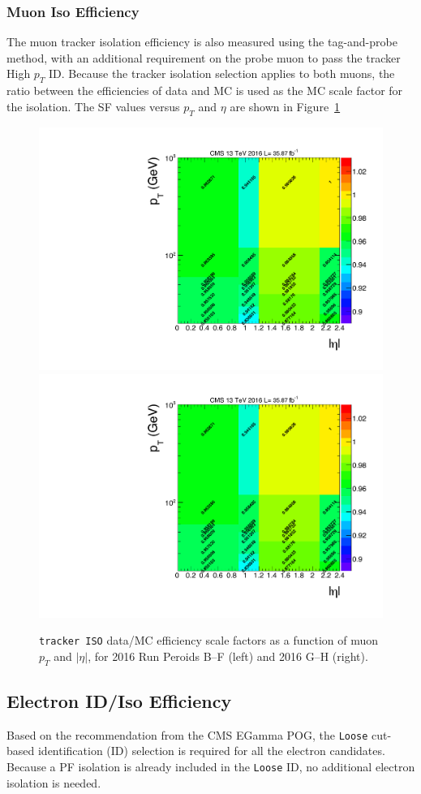 \subsubsection{Muon Iso Efficiency}
The muon tracker isolation efficiency is also measured using the tag-and-probe method, with an additional requirement on the probe muon to pass the tracker High $p_T$ ID. Because the tracker isolation selection applies to both muons, the ratio between the efficiencies of data and MC is used as the MC scale factor for the isolation. The SF values versus $p_T$ and $\eta$ are shown in Figure~\ref{fig:bg_muonisosf}
\begin{figure}[htbp]
\begin{center}
\includegraphics[width=0.49\linewidth, page=7]{figures/bg_muonidisoeff.pdf}
\includegraphics[width=0.49\linewidth, page=8]{figures/bg_muonidisoeff.pdf}
\caption{\texttt{tracker ISO} data/MC efficiency scale factors as a function of muon $p_T$ and $|\eta|$, for 2016 Run Peroids B--F (left) and 2016 G--H (right).}
\label{fig:bg_muonisosf}
\end{center}
\end{figure}

\subsection{Electron ID/Iso Efficiency}
Based on the recommendation from the CMS EGamma POG, the \texttt{Loose} cut-based identification (ID) selection is required for all the electron candidates. Because a PF isolation is already included in the \texttt{Loose} ID, no additional electron isolation is needed.

